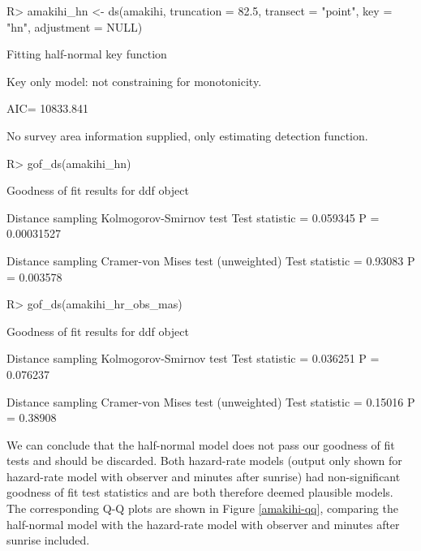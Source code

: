 \documentclass[article,shortnames]{jss}
\begin{document}
\begin{CodeChunk}
\begin{CodeInput}
R> amakihi_hn <- ds(amakihi, truncation = 82.5, transect = "point",
                 key = "hn", adjustment = NULL)
\end{CodeInput}
\begin{CodeOutput}
Fitting half-normal key function
\end{CodeOutput}
\begin{CodeOutput}
Key only model: not constraining for monotonicity.
\end{CodeOutput}
\begin{CodeOutput}
AIC= 10833.841
\end{CodeOutput}
\begin{CodeOutput}
No survey area information supplied, only estimating detection function.
\end{CodeOutput}
\begin{CodeInput}
R> gof_ds(amakihi_hn)
\end{CodeInput}
\begin{CodeOutput}

Goodness of fit results for ddf object

Distance sampling Kolmogorov-Smirnov test
Test statistic =  0.059345  P =  0.00031527 

Distance sampling Cramer-von Mises test (unweighted)
Test statistic =  0.93083  P =  0.003578 
\end{CodeOutput}
\begin{CodeInput}
R> gof_ds(amakihi_hr_obs_mas)
\end{CodeInput}
\begin{CodeOutput}

Goodness of fit results for ddf object

Distance sampling Kolmogorov-Smirnov test
Test statistic =  0.036251  P =  0.076237 

Distance sampling Cramer-von Mises test (unweighted)
Test statistic =  0.15016  P =  0.38908 
\end{CodeOutput}
\end{CodeChunk}

We can conclude that the half-normal model does not pass our goodness of
fit tests and should be discarded. Both hazard-rate models (output only
shown for hazard-rate model with observer and minutes after sunrise) had
non-significant goodness of fit test statistics and are both therefore
deemed plausible models. The corresponding Q-Q plots are shown in Figure
\ref{amakihi-qq}, comparing the half-normal model with the hazard-rate
model with observer and minutes after sunrise included.
\end{document}
